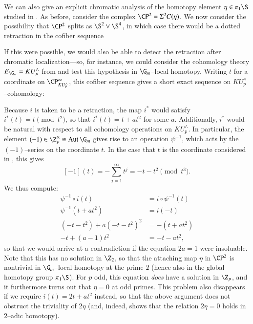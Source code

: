 \begin{example}
We can also give an explicit chromatic analysis of the homotopy element $\eta \in \pi_1 \S$ studied in .  As before, consider the complex $\CP^2 = \Susp^2 C(\eta)$.  We now consider the possibility that $\CP^2$ splits as $\S^2 \vee \S^4$, in which case there would be a dotted retraction in the cofiber sequence
\begin{center}
\end{center}
If this were possible, we would also be able to detect the retraction after chromatic localization---so, for instance, we could consider the cohomology theory $E_{\G_m} = KU^\wedge_p$ from  and test this hypothesis in $\G_m$--local homotopy.  Writing $t$ for a coordinate on $\CP^\infty_{KU^\wedge_p}$, this cofiber sequence gives a short exact sequence on $KU^\wedge_p$--cohomology:
\begin{center}
\end{center}
Because $i$ is taken to be a retraction, the map $i^*$ would satisfy $i^*(t) = t \pmod{t^2}$, so that $i^*(t) = t + at^2$ for some $a$.  Additionally, $i^*$ would be natural with respect to all cohomology operations on $KU^\wedge_p$.  In particular, the element $(-1) \in \Z_p^\times \cong \Aut \G_m$ gives rise to an operation $\psi^{-1}$, which acts by the $(-1)$--series on the coordinate $t$.  In the case that $t$ is the coordinate considered in , this gives \[[-1](t) = -\sum_{j=1}^\infty t^j = -t - t^2 \pmod{t^3}.\]  We thus compute:
\begin{align*}
\psi^{-1} \circ i(t) & = i \circ \psi^{-1}(t) \\
\psi^{-1}(t + at^2) & = i(-t) \\
(-t - t^2) + a(-t - t^2)^2 & = -(t + at^2) \\
-t + (a - 1) t^2 & = -t - at^2,
\end{align*}
so that we would arrive at a contradiction if the equation $2a = 1$ were insoluable.  Note that this has no solution in $\Z_2$, so that the attaching map $\eta$ in $\CP^2$ is nontrivial in $\G_m$--local homotopy at the prime $2$ (hence also in the global homotopy group $\pi_1 \S$).  For $p$ odd, this equation \emph{does} have a solution in $\Z_p$, and it furthermore turns out that $\eta = 0$ at odd primes.  This problem also disappears if we require $i(t) = 2t + at^2$ instead, so that the above argument does not obstruct the triviality of $2 \eta$ (and, indeed,  shows that the relation $2 \eta = 0$ holds in $2$--adic homotopy).
\end{example}

